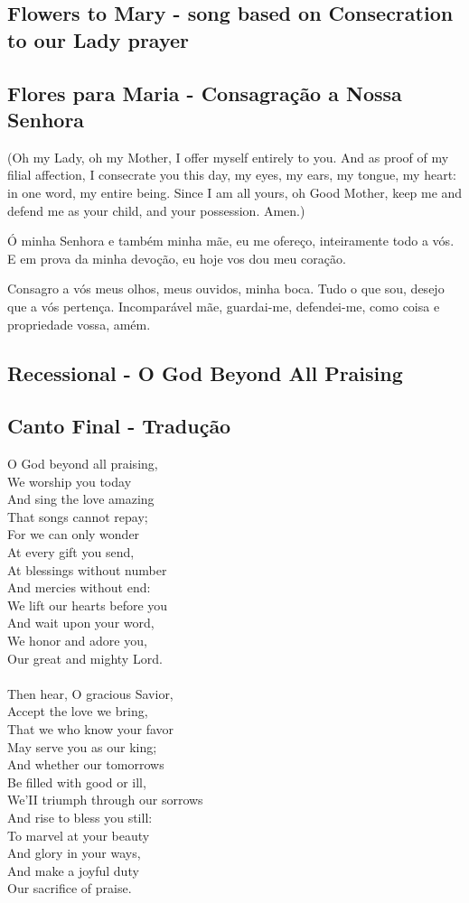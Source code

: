 \documentclass[10pt,a5]{article}
\newcommand \subsect[2] {\subsection*{#1} \switchcolumn \subsection*{#2} \switchcolumn*}
\begin{document}
\begin{paracol}{2}

\subsect{Flowers to Mary - song based on Consecration to our Lady prayer}{Flores para Maria - Consagra\c{c}\~ao a Nossa Senhora}

(Oh my Lady, oh my Mother,
I offer myself entirely to you.
And as proof of my filial affection,
I consecrate you this day,
my eyes, my ears, my tongue, my heart:
in one word, my entire being.
Since I am all yours,
oh Good Mother,
keep me and defend me as your child,
and your possession. Amen.)

\switchcolumn

Ó minha Senhora e também minha mãe,
eu me ofereço, inteiramente todo a vós.
E em prova da minha devoção,
eu hoje vos dou meu coração.

Consagro a vós meus olhos, meus ouvidos, minha boca.
Tudo o que sou, desejo que a vós pertença.
Incomparável mãe, guardai-me, defendei-me,
como coisa e propriedade vossa, amém.

\switchcolumn*

\subsect{Recessional - O God Beyond All Praising}{Canto Final - Tradu\c{c}\~ao}

O God beyond all praising,\\
We worship you today\\
And sing the love amazing\\
That songs cannot repay;\\
For we can only wonder\\
At every gift you send,\\
At blessings without number\\
And mercies without end:\\
We lift our hearts before you\\
And wait upon your word,\\
We honor and adore you,\\
Our great and mighty Lord.\\
\\
Then hear, O gracious Savior,\\
Accept the love we bring,\\
That we who know your favor\\
May serve you as our king;\\
And whether our tomorrows\\
Be filled with good or ill,\\
We'II triumph through our sorrows\\
And rise to bless you still:\\
To marvel at your beauty\\
And glory in your ways,\\
And make a joyful duty\\
Our sacrifice of praise.\\


\end{paracol}
\end{document}

